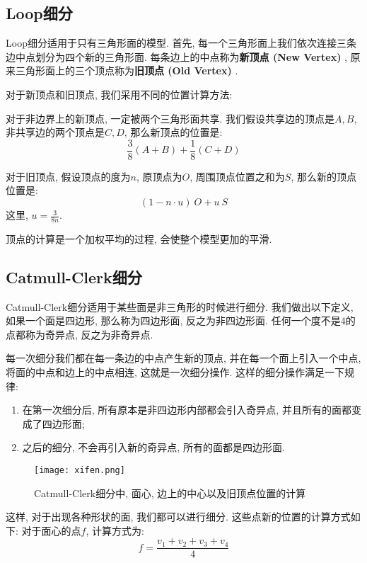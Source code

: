 \documentclass[openany]{progbookcn}
\begin{document}
\subsection{Loop细分}
Loop细分适用于只有三角形面的模型. 首先, 每一个三角形面上我们依次连接三条边中点划分为四个新的三角形面. 每条边上的中点称为\textbf{新顶点 (New Vertex) }, 原来三角形面上的三个顶点称为\textbf{旧顶点 (Old Vertex) }. 

对于新顶点和旧顶点, 我们采用不同的位置计算方法: 

对于非边界上的新顶点, 一定被两个三角形面共享. 我们假设共享边的顶点是$A,B$, 非共享边的两个顶点是$C,D$, 那么新顶点的位置是: 
\begin{equation}
	\frac{3}{8}(A+B)+\frac{1}{8}(C+D)
\end{equation}

对于旧顶点, 假设顶点的度为$n$, 原顶点为$O$, 周围顶点位置之和为$S$, 那么新的顶点位置是: 
\begin{equation}
	(1-n\cdot u)\ O+u\ S
\end{equation}
这里, $u=\frac{3}{8n}$. 

顶点的计算是一个加权平均的过程, 会使整个模型更加的平滑. 

\subsection{Catmull-Clerk细分}
Catmull-Clerk细分适用于某些面是非三角形的时候进行细分. 我们做出以下定义, 如果一个面是四边形, 那么称为四边形面, 反之为非四边形面. 任何一个度不是$4$的点都称为奇异点, 反之为非奇异点. 

每一次细分我们都在每一条边的中点产生新的顶点, 并在每一个面上引入一个中点, 将面的中点和边上的中点相连, 这就是一次细分操作. 这样的细分操作满足一下规律: 
\begin{enumerate}
	\item 在第一次细分后, 所有原本是非四边形内部都会引入奇异点, 并且所有的面都变成了四边形面; 
	\item 之后的细分, 不会再引入新的奇异点, 所有的面都是四边形面. 
\end{enumerate}

\begin{figure}[H]
	\centering
	\texttt{[image: xifen.png]}
	\caption{Catmull-Clerk细分中, 面心, 边上的中心以及旧顶点位置的计算}
	\label{fig:xifen}
\end{figure}
这样, 对于出现各种形状的面, 我们都可以进行细分. 这些点新的位置的计算方式如下: 
对于面心的点$f$, 计算方式为: 
\begin{equation}
	f=\frac{v_1+v_2+v_3+v_4}{4}
\end{equation}
\end{document}
